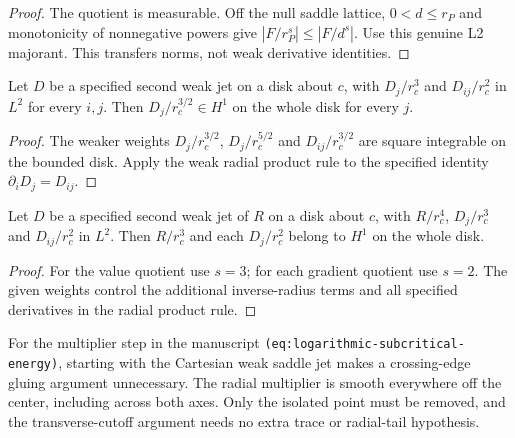 \begin{proof}
\leanok
The quotient is measurable. Off the null saddle lattice,
$0<d\le r_P$ and monotonicity of nonnegative powers give
$|F/r_P^s|\le |F/d^s|$. Use this genuine L2 majorant.
This transfers norms, not weak derivative identities.
\end{proof}

\begin{lemma}
\label{lem:radial-gradient-h1}
\leanok
Let $D$ be a specified second weak jet on a disk about $c$, with
$D_j/r_c^3$ and $D_{ij}/r_c^2$ in $L^2$ for every $i,j$.
Then $D_j/r_c^{3/2}\in H^1$ on the whole disk for every $j$.
\end{lemma}

\begin{proof}
\leanok
The weaker weights $D_j/r_c^{3/2}$, $D_j/r_c^{5/2}$ and
$D_{ij}/r_c^{3/2}$ are square integrable on the bounded disk.
Apply the weak radial product rule to the specified identity
$\partial_iD_j=D_{ij}$.
\end{proof}

\begin{lemma}
\label{lem:radial-ray-quotients-h1}
\leanok
Let $D$ be a specified second weak jet of $R$ on a disk about $c$, with
$R/r_c^4$, $D_j/r_c^3$ and $D_{ij}/r_c^2$ in $L^2$.
Then $R/r_c^3$ and each $D_j/r_c^2$ belong to $H^1$ on the whole disk.
\end{lemma}

\begin{proof}
\leanok
For the value quotient use $s=3$; for each gradient quotient use $s=2$.
The given weights control the additional inverse-radius terms and all
specified derivatives in the radial product rule.
\end{proof}

\begin{remark}
For the multiplier step in the manuscript
\texttt{(eq:logarithmic-subcritical-energy)}, starting with the Cartesian
weak saddle jet makes a crossing-edge gluing argument unnecessary.
The radial multiplier is smooth everywhere off the center, including
across both axes. Only the isolated point must be removed, and the
transverse-cutoff argument needs no extra trace or radial-tail hypothesis.
\end{remark}

